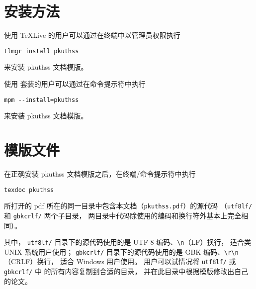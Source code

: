 	\section{安装方法}\label{sec:inst}

	使用 \TeX{}Live 的用户可以通过在终端中以管理员权限执行
\begin{Verbatim}[frame = single]
tlmgr install pkuthss
\end{Verbatim}
	来安装 pkuthss 文档模版。

	使用 \CTeX{} 套装的用户可以通过在命令提示符中执行
\begin{Verbatim}[frame = single]
mpm --install=pkuthss
\end{Verbatim}
	来安装 pkuthss 文档模版。

	\section{模版文件}\label{sec:doc-dir}

	在正确安装 pkuthss 文档模版之后，在终端/命令提示符中执行
\begin{Verbatim}[frame = single]
texdoc pkuthss
\end{Verbatim}
	所打开的 pdf 所在的同一目录中包含本文档（\verb|pkuthss.pdf|）的源代码%
	（\verb|utf8lf/| 和 \verb|gbkcrlf/| 两个子目录，
	两目录中代码除使用的编码和换行符外基本上完全相同）。

	其中，%
	\verb|utf8lf/| 目录下的源代码使用的是 UTF-8 编码、\verb|\n|（LF）换行，
	适合类 UNIX 系统用户使用；%
	\verb|gbkcrlf/| 目录下的源代码使用的是 GBK 编码、\verb|\r\n|（CRLF）换行，
	适合 Windows 用户使用。%
	用户可以试情况将 \verb|utf8lf/| 或 \verb|gbkcrlf/| 中
	的所有内容复制到合适的目录，
	并在此目录中根据模版修改出自己的论文。

